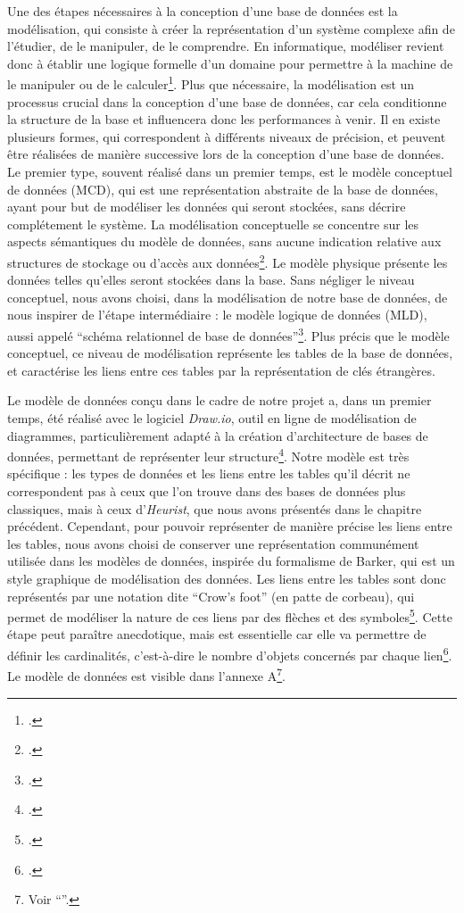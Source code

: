 Une des étapes nécessaires à la conception d'une base de données est la modélisation, qui consiste à créer la représentation d'un système complexe afin de l'étudier, de le manipuler, de le comprendre. En informatique, modéliser revient donc à établir une logique formelle d'un domaine pour permettre à la machine de le manipuler ou de le calculer\footcite{bermes_2025}.  
Plus que nécessaire, la modélisation est un processus crucial dans la conception d'une base de données, car cela conditionne la structure de la base et influencera donc les performances à venir. Il en existe plusieurs formes, qui correspondent à différents niveaux de précision, et peuvent être réalisées de manière successive lors de la conception d'une base de données. Le premier type, souvent réalisé dans un premier temps, est le modèle conceptuel de données (MCD), qui est une représentation abstraite de la base de données, ayant pour but de modéliser les données qui seront stockées, sans décrire complétement le système. La modélisation conceptuelle se concentre sur les aspects sémantiques du modèle de données, sans aucune indication relative aux structures de stockage ou d'accès aux données\footcite[p. 13]{Soutou_2022}. Le modèle physique présente les données telles qu'elles seront stockées dans la base. Sans négliger le niveau conceptuel, nous avons choisi, dans la modélisation de notre base de données, de nous inspirer de l'étape intermédiaire : le modèle logique de données (MLD), aussi appelé \enquote{schéma relationnel de base de données}\footcite[p. 145]{Bergougnoux_2019}. Plus précis que le modèle conceptuel, ce niveau de modélisation représente les tables de la base de données, et caractérise les liens entre ces tables par la représentation de clés étrangères.



Le modèle de données conçu dans le cadre de notre projet a, dans un premier temps, été réalisé avec le logiciel \emph{Draw.io}, outil en ligne de modélisation de diagrammes, particulièrement adapté à la création d'architecture de bases de données, permettant de représenter leur structure\footcite{drawio}. 
Notre modèle est très spécifique : les types de données et les liens entre les tables qu'il décrit ne correspondent pas à ceux que l'on trouve dans des bases de données plus classiques, mais à ceux d'\emph{Heurist}, que nous avons présentés dans le chapitre précédent. Cependant, pour pouvoir représenter de manière précise les liens entre les tables, nous avons choisi de conserver une représentation communément utilisée dans les modèles de données, inspirée du formalisme de Barker, qui est un style graphique de modélisation des données. Les liens entre les tables sont donc représentés par une notation dite \enquote{Crow's foot} (en patte de corbeau), qui permet de modéliser la nature de ces liens par des flèches et des symboles\footcite[p. 7]{Hainaut_2015}. Cette étape peut paraître anecdotique, mais est essentielle car elle va permettre de définir les cardinalités, c'est-à-dire le nombre d'objets concernés par chaque lien\footcite[p. 32]{Soutou_2022}. 
Le modèle de données est visible dans l'annexe A\footnote{Voir \enquote{}.}. 


